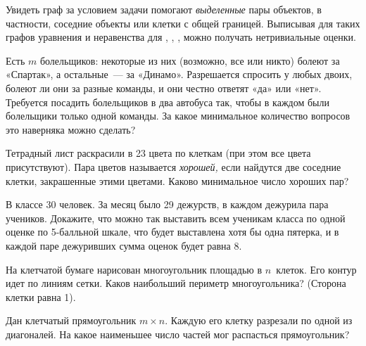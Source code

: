 Увидеть граф за условием задачи помогают \emph{выделенные} пары объектов,
в частности, соседние объекты или клетки с общей границей.
Выписывая для таких графов уравнения и неравенства для
, , , можно получать нетривиальные оценки.

\begin{problems}

\item
Есть $m$ болельщиков: некоторые из них (возможно, все или никто) болеют за
«Спартак», а остальные~— за «Динамо».
Разрешается спросить у любых двоих, болеют ли они за разные команды, и они
честно ответят «да» или «нет».
Требуется посадить болельщиков в два автобуса так, чтобы в каждом были
болельщики только одной команды.
За какое минимальное количество вопросов это наверняка можно сделать?

\item
Тетрадный лист раскрасили в 23 цвета по клеткам (при этом все цвета
присутствуют).
Пара цветов называется \emph{хорошей,} если найдутся две соседние клетки,
закрашенные этими цветами.
Каково минимальное число хороших пар?

\item
В классе 30 человек.
За месяц было 29 дежурств, в каждом дежурила пара учеников.
Докажите, что можно так выставить всем ученикам класса по одной оценке
по 5-балльной шкале, что будет выставлена хотя бы одна пятерка, и в каждой паре
дежуривших сумма оценок будет равна 8.

\item
На клетчатой бумаге нарисован многоугольник площадью в $n$~клеток.
Его контур идет по линиям сетки.
Каков наибольший периметр многоугольника?
(Сторона клетки равна 1).

\item
Дан клетчатый прямоугольник $m \times n$.
Каждую его клетку разрезали по одной из диагоналей.
На какое наименьшее число частей мог распасться прямоугольник?

\end{problems}

